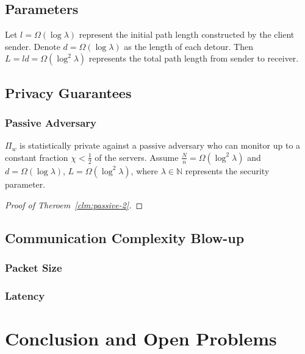 \clearpage

\subsection{Parameters}

Let $l = \Omega(\log \lambda)$ represent the initial path length constructed by the client sender. Denote $d = \Omega(\log \lambda)$ as the length of each detour. Then $L = ld = \Omega(\log^2 \lambda)$ represents the total path length from sender to receiver.

\subsection{Privacy Guarantees}

\subsubsection{Passive Adversary}

\begin{theorem} \label{clm:passive-2}
    $\Pi_w$ is statistically private against a passive adversary who can monitor up to a constant fraction $\chi < \frac{1}{2}$ of the servers. Assume $\frac{N}{n} = \Omega(\log^2 \lambda)$ and $d = \Omega(\log \lambda)$, $L = \Omega(\log^2 \lambda)$, where $\lambda \in \mathbb{N}$ represents the security parameter.\\
\end{theorem}

\begin{proof} [Proof of Theroem~\ref{clm:passive-2}]
    
\end{proof}


\subsection{Communication Complexity Blow-up}

\subsubsection{Packet Size}

\subsubsection{Latency}




\section{Conclusion and Open Problems}


